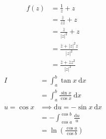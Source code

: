 \documentclass[a4paper,11pt]{article}
\theoremstyle{plain}
\theoremstyle{definition}
\newcommand{\dx}{\text{d}}
\begin{document}
\begin{align*}
	f(z)&=\frac{1}{z}+z\\
		&=\frac{\bar{z}}{z\bar{z}}+z\\
		&=\frac{\bar{z}}{|z|^2}+z \\
		&=\frac{\bar{z}+|z|^2z}{|z|^2}\\
		&=\frac{\bar{z}+\bar{z}z^2}{|z|^2}
\end{align*}
\begin{align*}
	I &= \int_a^b \tan x\ \dx x \\
	  &= \int_a^b \frac{\sin x}{\cos x}\ \dx x \\
	u = \cos x &\implies \dx u = -\sin x\ \dx x\\
	  &= -\int_{\cos a}^{\cos b} \frac{\dx u}{u} \\
	  &= \ln\left(\frac{\cos a}{{\cos b}}\right) \\
\end{align*}
\end{document}
